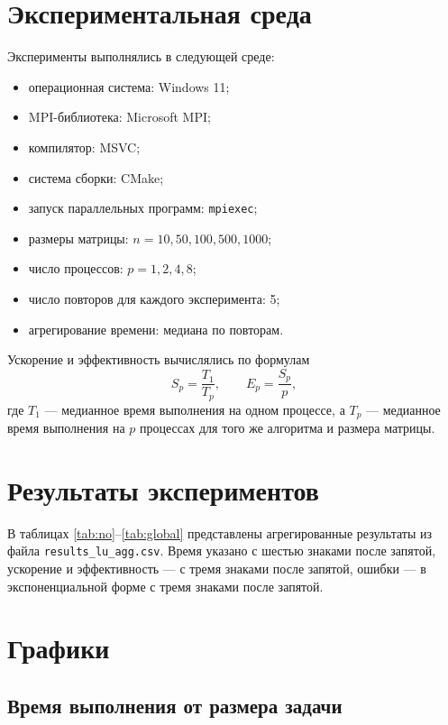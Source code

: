 \documentclass[a4paper,14pt]{extarticle}
\begin{document}
\section{Экспериментальная среда}

Эксперименты выполнялись в следующей среде:
\begin{itemize}
    \item операционная система: Windows 11;
    \item MPI-библиотека: Microsoft MPI;
    \item компилятор: MSVC;
    \item система сборки: CMake;
    \item запуск параллельных программ: \texttt{mpiexec};
    \item размеры матрицы: $n = 10, 50, 100, 500, 1000$;
    \item число процессов: $p = 1,2,4,8$;
    \item число повторов для каждого эксперимента: 5;
    \item агрегирование времени: медиана по повторам.
\end{itemize}

Ускорение и эффективность вычислялись по формулам
\begin{equation}
    S_p = \frac{T_1}{T_p}, \qquad E_p = \frac{S_p}{p},
\end{equation}
где $T_1$ --- медианное время выполнения на одном процессе, а $T_p$ --- медианное время выполнения на $p$ процессах для того же алгоритма и размера матрицы.

\section{Результаты экспериментов}

В таблицах \ref{tab:no}--\ref{tab:global} представлены агрегированные результаты из файла \texttt{results\_lu\_agg.csv}. Время указано с шестью знаками после запятой, ускорение и эффективность --- с тремя знаками после запятой, ошибки --- в экспоненциальной форме с тремя знаками после запятой.

\scriptsize

\normalsize

\section{Графики}

\subsection{Время выполнения от размера задачи}
\end{document}
